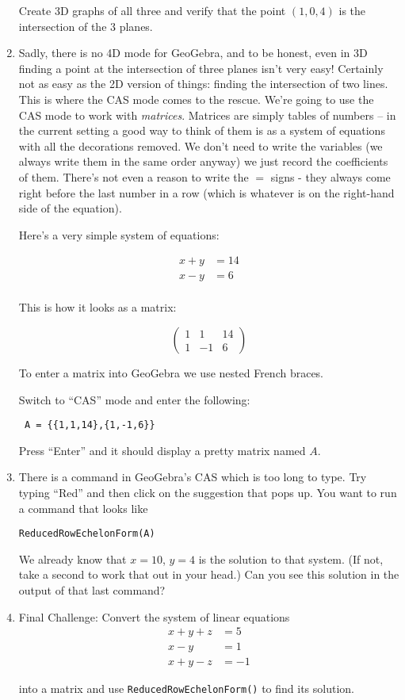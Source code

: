 \begin{enumerate}
Create 3D graphs of all three and verify that the point $(1,0,4)$ is the intersection of the 3 planes.

\vfill

\item Sadly, there is no 4D mode for GeoGebra, and to be honest, even in 3D finding a point at the intersection of three planes isn't very easy!  Certainly not as easy as the 2D version of things: finding the intersection of two lines.  This is where the CAS mode comes to the rescue.  We're going to use the CAS mode to work with {\em matrices}.  Matrices are simply tables of numbers -- in the current setting a good way to think of them is as a system of equations with all the decorations removed.  We don't need to write the variables (we always write them in the same order anyway) we just record the coefficients of them.  There's not even a reason to write the $=$ signs - they always come right before the last number in a row (which is whatever is on the right-hand side of the equation).

Here's a very simple system of equations:

\begin{align*}
x + y &= 14\\
x - y &= 6\\
\end{align*}

This is how it looks as a matrix:

\[ \left( \begin{array}{ccc} 1 & 1 & 14 \\ 1 & -1 & 6 \end{array} \right) \]

To enter a matrix into GeoGebra we use nested French braces.

Switch to ``CAS'' mode and enter the following:

\verb+ A = {{1,1,14},{1,-1,6}}+

Press ``Enter'' and it should display a pretty matrix named $A$.

\vfill

\item There is a command in GeoGebra's CAS which is too long to type.  Try typing ``Red'' and then click on the suggestion that pops up.  You want to run a command that looks like

\verb+ReducedRowEchelonForm(A)+

We already know that $x=10$, $y=4$ is the solution to that system.  (If not, take a second to work that out in your head.)  Can you see this solution in the output of that last command?

\vspace{.7in}

\item Final Challenge: Convert the system of linear equations
\begin{align*}
x + y + z &= 5\\
x - y \phantom{ + zz } &= 1\\
x + y - z &= -1
\end{align*}

into a matrix and use \verb+ReducedRowEchelonForm()+ to find its solution.

\vfill

\end{enumerate}
